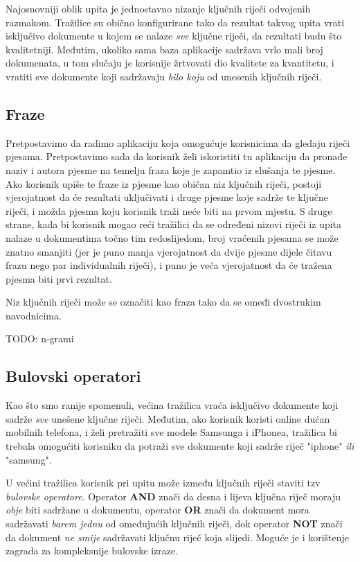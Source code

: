 \documentclass[11pt]{scrreprt}
\begin{document}
Najosnovniji oblik upita je jednostavno nizanje ključnih riječi odvojenih razmakom. Tražilice su obično konfigurirane tako da rezultat takvog upita vrati isključivo dokumente u kojem se nalaze \textit{sve} ključne riječi, da rezultati budu što kvalitetniji. Međutim, ukoliko sama baza aplikacije sadržava vrlo mali broj dokumenata, u tom slučaju je korisnije žrtvovati dio kvalitete za kvantitetu, i vratiti sve dokumente koji sadržavaju \textit{bilo koju} od unesenih ključnih riječi.

\subsection{Fraze}

Pretpostavimo da radimo aplikaciju koja omogućuje korisnicima da gledaju riječi pjesama. Pretpostavimo sada da korisnik želi iskoristiti tu aplikaciju da pronađe naziv i autora pjesme na temelju fraza koje je zapamtio iz slušanja te pjesme. Ako korisnik upiše te fraze iz pjesme kao običan niz ključnih riječi, postoji vjerojatnost da će rezultati uključivati i druge pjesme koje sadrže te ključne riječi, i možda pjesma koju korisnik traži neće biti na prvom mjestu. S druge strane, kada bi korisnik mogao reći tražilici da se određeni nizovi riječi iz upita nalaze u dokumentima točno tim redoslijedom, broj vraćenih pjesama se može znatno smanjiti (jer je puno manja vjerojatnost da dvije pjesme dijele čitavu frazu nego par individualnih riječi), i puno je veća vjerojatnost da će tražena pjesma biti prvi rezultat.

Niz ključnih riječi može se označiti kao fraza tako da se omeđi dvostrukim navodnicima.

TODO: n-grami

\subsection{Bulovski operatori}

Kao što smo ranije spomenuli, većina tražilica vraća isključivo dokumente koji sadrže \textit{sve} unešene ključne riječi. Međutim, ako korisnik koristi online dućan mobilnih telefona, i želi pretražiti sve modele Samsunga i iPhonea, tražilica bi trebala omogućiti korisniku da potraži sve dokumente koji sadrže riječ "iphone" \textit{ili} "samsung".

U većini tražilica korisnik pri upitu može između ključnih riječi staviti tzv \textit{bulovske operatore}. Operator \textbf{AND} znači da desna i lijeva ključna riječ moraju \textit{obje} biti sadržane u dokumentu, operator \textbf{OR} znači da dokument mora sadržavati \textit{barem jednu} od omeđujućih ključnih riječi, dok operator \textbf{NOT} znači da dokument \textit{ne smije} sadržavati ključnu riječ koja slijedi. Moguće je i korištenje zagrada za kompleksnije bulovske izraze.
\end{document}
